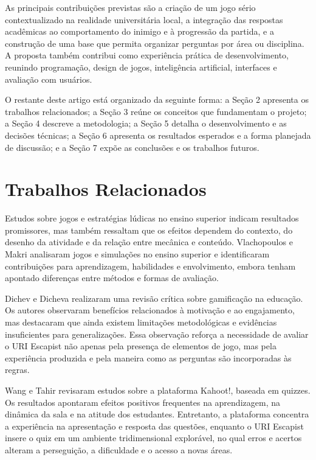\documentclass[12pt]{article}
\begin{document}
As principais contribuições previstas são a criação de um jogo sério contextualizado na realidade universitária local, a integração das respostas acadêmicas ao comportamento do inimigo e à progressão da partida, e a construção de uma base que permita organizar perguntas por área ou disciplina. A proposta também contribui como experiência prática de desenvolvimento, reunindo programação, design de jogos, inteligência artificial, interfaces e avaliação com usuários.

O restante deste artigo está organizado da seguinte forma: a Seção 2 apresenta os trabalhos relacionados; a Seção 3 reúne os conceitos que fundamentam o projeto; a Seção 4 descreve a metodologia; a Seção 5 detalha o desenvolvimento e as decisões técnicas; a Seção 6 apresenta os resultados esperados e a forma planejada de discussão; e a Seção 7 expõe as conclusões e os trabalhos futuros.

\section{Trabalhos Relacionados}

Estudos sobre jogos e estratégias lúdicas no ensino superior indicam resultados promissores, mas também ressaltam que os efeitos dependem do contexto, do desenho da atividade e da relação entre mecânica e conteúdo. Vlachopoulos e Makri \cite{vlachopoulos2017} analisaram jogos e simulações no ensino superior e identificaram contribuições para aprendizagem, habilidades e envolvimento, embora tenham apontado diferenças entre métodos e formas de avaliação.

Dichev e Dicheva \cite{dichev2017} realizaram uma revisão crítica sobre gamificação na educação. Os autores observaram benefícios relacionados à motivação e ao engajamento, mas destacaram que ainda existem limitações metodológicas e evidências insuficientes para generalizações. Essa observação reforça a necessidade de avaliar o URI Escapist não apenas pela presença de elementos de jogo, mas pela experiência produzida e pela maneira como as perguntas são incorporadas às regras.

Wang e Tahir \cite{wang2020} revisaram estudos sobre a plataforma Kahoot!, baseada em quizzes. Os resultados apontaram efeitos positivos frequentes na aprendizagem, na dinâmica da sala e na atitude dos estudantes. Entretanto, a plataforma concentra a experiência na apresentação e resposta das questões, enquanto o URI Escapist insere o quiz em um ambiente tridimensional explorável, no qual erros e acertos alteram a perseguição, a dificuldade e o acesso a novas áreas.
\end{document}
